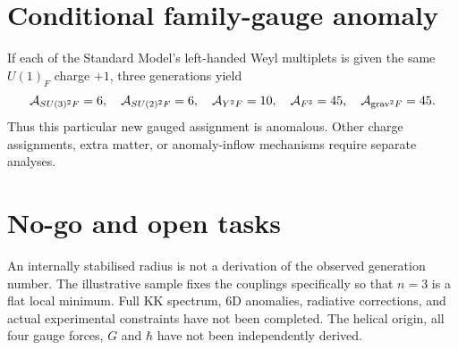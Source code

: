 \documentclass[11pt]{article}
\begin{document}
\section{Conditional family-gauge anomaly}
If each of the Standard Model's left-handed Weyl multiplets is given the same $U(1)_F$ charge $+1$, three generations yield
\begin{equation}
{\cal A}_{SU(3)^2 F}=6,\quad {\cal A}_{SU(2)^2 F}=6,\quad
{\cal A}_{Y^2F}=10,\quad {\cal A}_{F^3}=45,\quad
{\cal A}_{\mathrm{grav}^2F}=45.
\end{equation}
Thus this particular new gauged assignment is anomalous. Other charge assignments, extra matter, or anomaly-inflow mechanisms require separate analyses.
\section{No-go and open tasks}
An internally stabilised radius is not a derivation of the observed generation number. The illustrative sample fixes the couplings specifically so that $n=3$ is a flat local minimum. Full KK spectrum, 6D anomalies, radiative corrections, and actual experimental constraints have not been completed. The helical origin, all four gauge forces, $G$ and $\hbar$ have not been independently derived.
\end{document}
